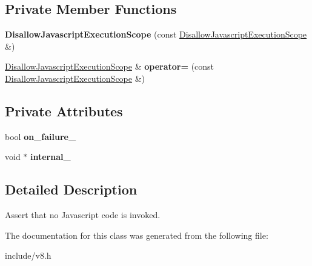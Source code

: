 \subsection*{Private Member Functions}
\begin{DoxyCompactItemize}
\item 
{\bfseries Disallow\+Javascript\+Execution\+Scope} (const \hyperlink{classv8_1_1_isolate_1_1_disallow_javascript_execution_scope}{Disallow\+Javascript\+Execution\+Scope} \&)\hypertarget{classv8_1_1_isolate_1_1_disallow_javascript_execution_scope_a08a0a0dfb4804078bb86bf266aa36f05}{}\label{classv8_1_1_isolate_1_1_disallow_javascript_execution_scope_a08a0a0dfb4804078bb86bf266aa36f05}

\item 
\hyperlink{classv8_1_1_isolate_1_1_disallow_javascript_execution_scope}{Disallow\+Javascript\+Execution\+Scope} \& {\bfseries operator=} (const \hyperlink{classv8_1_1_isolate_1_1_disallow_javascript_execution_scope}{Disallow\+Javascript\+Execution\+Scope} \&)\hypertarget{classv8_1_1_isolate_1_1_disallow_javascript_execution_scope_aa8f45d19c0dc9467a0df64e4081ce75c}{}\label{classv8_1_1_isolate_1_1_disallow_javascript_execution_scope_aa8f45d19c0dc9467a0df64e4081ce75c}

\end{DoxyCompactItemize}
\subsection*{Private Attributes}
\begin{DoxyCompactItemize}
\item 
bool {\bfseries on\+\_\+failure\+\_\+}\hypertarget{classv8_1_1_isolate_1_1_disallow_javascript_execution_scope_a2b3fe3cb1347fadbb6233e3ba4802ed9}{}\label{classv8_1_1_isolate_1_1_disallow_javascript_execution_scope_a2b3fe3cb1347fadbb6233e3ba4802ed9}

\item 
void $\ast$ {\bfseries internal\+\_\+}\hypertarget{classv8_1_1_isolate_1_1_disallow_javascript_execution_scope_ac86111f7dadf1eb5d5ac2c49b3faa06a}{}\label{classv8_1_1_isolate_1_1_disallow_javascript_execution_scope_ac86111f7dadf1eb5d5ac2c49b3faa06a}

\end{DoxyCompactItemize}


\subsection{Detailed Description}
Assert that no Javascript code is invoked. 

The documentation for this class was generated from the following file\+:\begin{DoxyCompactItemize}
\item 
include/v8.\+h\end{DoxyCompactItemize}
